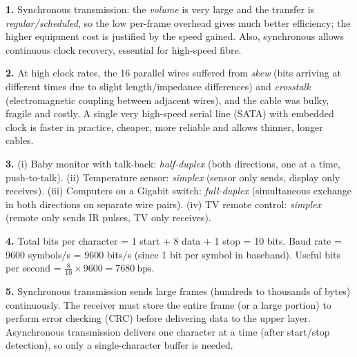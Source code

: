 \documentclass[11pt]{article}
\begin{document}
\begin{corrige}[Exercise n°1]
\textbf{1.} Synchronous transmission: the \emph{volume} is very large and the transfer is \emph{regular/scheduled}, so the low per-frame overhead gives much better efficiency; the higher equipment cost is justified by the speed gained. Also, synchronous allows continuous clock recovery, essential for high-speed fibre.

\textbf{2.} At high clock rates, the 16 parallel wires suffered from \emph{skew} (bits arriving at different times due to slight length/impedance differences) and \emph{crosstalk} (electromagnetic coupling between adjacent wires), and the cable was bulky, fragile and costly. A single very high-speed serial line (SATA) with embedded clock is faster in practice, cheaper, more reliable and allows thinner, longer cables.

\textbf{3.} (i) Baby monitor with talk-back: \emph{half-duplex} (both directions, one at a time, push-to-talk). (ii) Temperature sensor: \emph{simplex} (sensor only sends, display only receives). (iii) Computers on a Gigabit switch: \emph{full-duplex} (simultaneous exchange in both directions on separate wire pairs). (iv) TV remote control: \emph{simplex} (remote only sends IR pulses, TV only receives).

\textbf{4.} Total bits per character = 1 start + 8 data + 1 stop = 10 bits. Baud rate = 9600 symbols/s = 9600 bits/s (since 1 bit per symbol in baseband). Useful bits per second = $\frac{8}{10} \times 9600 = 7680\ \mathrm{bps}$.

\textbf{5.} Synchronous transmission sends large frames (hundreds to thousands of bytes) continuously. The receiver must store the entire frame (or a large portion) to perform error checking (CRC) before delivering data to the upper layer. Asynchronous transmission delivers one character at a time (after start/stop detection), so only a single-character buffer is needed.
\end{corrige}
\end{document}
